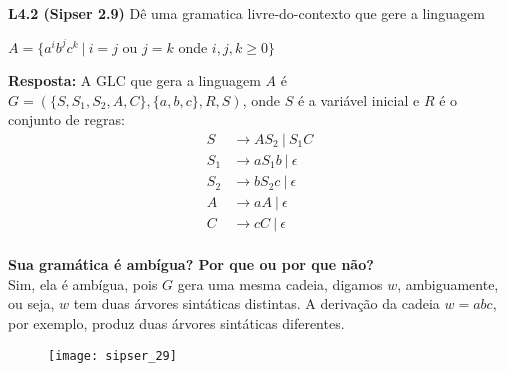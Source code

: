 
\noindent \textbf{L4.2 (Sipser 2.9)} Dê uma gramatica livre-do-contexto que gere a linguagem
\begin{center}
$A = \{a^ib^jc^k \ |\ i = j$ ou $j = k$ onde $i, j, k \geq 0\}$
\end{center}

\textbf{Resposta: } A GLC que gera a linguagem $A$ é $G = (\{S, S_1, S_2, A, C\}, \{a, b, c\}, R, S)$, onde $S$ é a variável inicial e $R$ é o conjunto de regras:
\begin{align*}
    S &\rightarrow AS_2 \ |\ S_1C \\
    S_1 &\rightarrow aS_1b \ |\ \epsilon \\
    S_2 &\rightarrow bS_2c \ |\ \epsilon \\
    A &\rightarrow aA \ |\ \epsilon \\
    C &\rightarrow cC \ |\ \epsilon \\
\end{align*}

\textbf{Sua gramática é ambígua? Por que ou por que não?}\\[3pt]
Sim, ela é ambígua, pois $G$ gera uma mesma cadeia, digamos $w$, ambiguamente, ou seja, $w$ tem duas árvores sintáticas distintas. A derivação da cadeia $w = abc$, por exemplo, produz duas árvores sintáticas diferentes.
\begin{figure}[H]
\texttt{[image: sipser\_29]}
\centering
\end{figure}